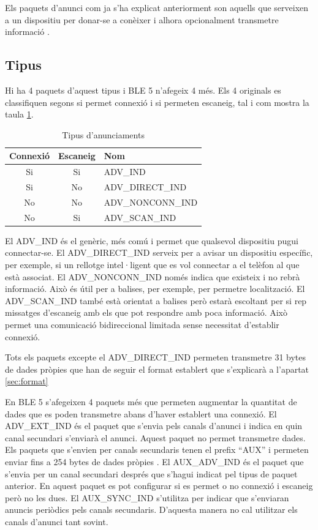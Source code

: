 Els paquets d'anunci com ja s'ha explicat anteriorment son aquells que serveixen a un dispositiu per donar-se a conèixer i alhora opcionalment transmetre informació \cite{Advertising}.

\subsection{Tipus}
Hi ha 4 paquets d'aquest tipus i BLE 5 n'afegeix 4 més.
Els 4 originals es classifiquen segons si permet connexió i si permeten escaneig, tal i com mostra la taula \ref{tab:Advertisment_Types}.

\begin{table}[!h]
	\begin{center}
		\begin{tabular}{|c|c|l|}
			\hline
			Connexió	&	Escaneig	&	Nom	\\	\hline
			Si			&	Si			&	ADV\_IND	\\	\hline
			Si			&	No			&	ADV\_DIRECT\_IND	\\	\hline
			No			&	No			&	ADV\_NONCONN\_IND	\\	\hline
			No			&	Si			&	ADV\_SCAN\_IND	\\	\hline
		\end{tabular}
	\end{center}
\caption{Tipus d'anunciaments}
\label{tab:Advertisment_Types}
\end{table}


El ADV\_IND és el genèric, més comú i permet que qualsevol dispositiu pugui connectar-se.
El ADV\_DIRECT\_IND serveix per a avisar un dispositiu específic, per exemple, si un rellotge intel·ligent que es vol connectar a el telèfon al que està associat.
El ADV\_NONCONN\_IND només indica que existeix i no rebrà informació.
Això és útil per a balises, per exemple, per permetre localització.
El ADV\_SCAN\_IND també està orientat a balises però estarà escoltant per si rep missatges d'escaneig amb els que pot respondre amb poca informació.
Això permet una comunicació bidireccional limitada sense necessitat d'establir connexió.

Tots els paquets excepte el ADV\_DIRECT\_IND permeten transmetre 31 bytes de dades pròpies que han de seguir el format establert que s'explicarà a l'apartat \ref{sec:format}

\label{Advertising_Extension_PDU}
En BLE 5 s'afegeixen 4 paquets més que permeten augmentar la quantitat de dades que es poden transmetre abans d'haver establert una connexió.
El ADV\_EXT\_IND és el paquet que s'envia pels canals d'anunci i indica en quin canal secundari s'enviarà el anunci. Aquest paquet no permet transmetre dades.
Els paquets que s'envien per canals secundaris tenen el prefix ``AUX'' i permeten enviar fins a 254 bytes de dades pròpies .
El AUX\_ADV\_IND és el paquet que s'envia per un canal secundari després que s'hagui indicat pel tipus de paquet anterior.
En aquest paquet es pot configurar si es permet o no connexió i escaneig però no les dues.
El AUX\_SYNC\_IND s'utilitza per indicar que s'enviaran anuncis periòdics pels canals secundaris.
D'aquesta manera no cal utilitzar els canals d'anunci tant sovint.

